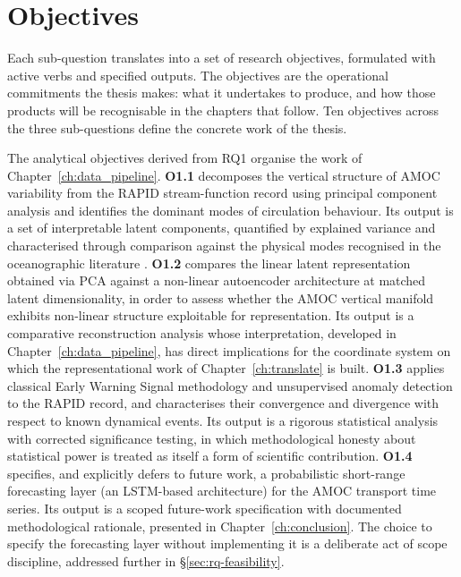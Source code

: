 \section{Objectives}
\label{sec:objectives}

Each sub-question translates into a set of research objectives, formulated with active verbs and specified outputs. The objectives are the operational commitments the thesis makes: what it undertakes to produce, and how those products will be recognisable in the chapters that follow. Ten objectives across the three sub-questions define the concrete work of the thesis.

The analytical objectives derived from RQ1 organise the work of Chapter~\ref{ch:data_pipeline}. \textbf{O1.1} decomposes the vertical structure of AMOC variability from the RAPID stream-function record using principal component analysis and identifies the dominant modes of circulation behaviour. Its output is a set of interpretable latent components, quantified by explained variance and characterised through comparison against the physical modes recognised in the oceanographic literature \citep{buckley2016}. \textbf{O1.2} compares the linear latent representation obtained via PCA against a non-linear autoencoder architecture at matched latent dimensionality, in order to assess whether the AMOC vertical manifold exhibits non-linear structure exploitable for representation. Its output is a comparative reconstruction analysis whose interpretation, developed in Chapter~\ref{ch:data_pipeline}, has direct implications for the coordinate system on which the representational work of Chapter~\ref{ch:translate} is built. \textbf{O1.3} applies classical Early Warning Signal methodology and unsupervised anomaly detection to the RAPID record, and characterises their convergence and divergence with respect to known dynamical events. Its output is a rigorous statistical analysis with corrected significance testing, in which methodological honesty about statistical power is treated as itself a form of scientific contribution. \textbf{O1.4} specifies, and explicitly defers to future work, a probabilistic short-range forecasting layer (an LSTM-based architecture) for the AMOC transport time series. Its output is a scoped future-work specification with documented methodological rationale, presented in Chapter~\ref{ch:conclusion}. The choice to specify the forecasting layer without implementing it is a deliberate act of scope discipline, addressed further in §\ref{sec:rq-feasibility}.

